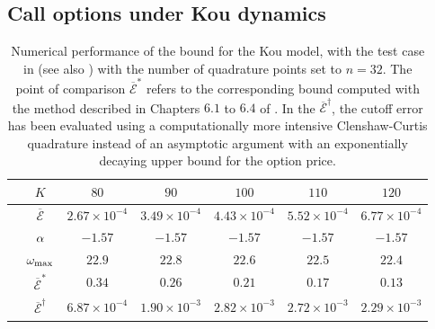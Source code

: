 \documentclass[11pt]{amsart}
\begin{document}
\subsection{Call options under Kou dynamics}

\begin{table}
\begin{center}\begin{tabular}{ccccccc}
\hline
 & $K$ & $80$ & $90$ & $100$ & $110$ & $120$\\
\hline
 & $\overline{\mathcal E}$ & $ 2.67 \times 10^{-4} $ & $  3.49 \times 10^{-4} $ & $  4.43 \times 10^{-4} $ & $ 5.52 \times 10^{-4} $ & $ 6.77 \times 10^{-4} $ \\ 
  & $\alpha$ & $ -1.57 $ & $  -1.57 $ & $  -1.57$ & $ -1.57 $ & $ -1.57$ \\ 
  & $\omega_{\mathrm{\max}}$ & $ 22.9 $ & $  22.8 $ & $  22.6$ & $ 22.5 $ & $22.4$ \\ 
\hline
  &$\overline{\mathcal E}^*$   & $ 0.34 $ & $  0.26 $ & $  0.21$ & $ 0.17 $ & $0.13$ \\ 
 & $\overline{\mathcal E}^{\dagger}$  & $ 6.87 \times 10^{-4} $ & $  1.90 \times 10^{-3} $ & $  2.82 \times 10^{-3} $ & $ 2.72 \times 10^{-3} $ & $ 2.29 \times 10^{-3} $ \\ 
 \hline
\end{tabular}
\end{center}
\caption{\label{tb:usvsleekou}
Numerical performance of the bound for the Kou model, with the test case in
\cite{toivanen2007numerical} (see also \cite{d2005robust}) with the number
of quadrature points set to $n=32$.
The point of comparison $\overline{\mathcal E}^*$ refers to the corresponding bound computed
with the method described in Chapters $6.1$ to $6.4$ of \cite{lee2004option}.
In the $\overline{\mathcal E}^{\dagger}$, the cutoff error has been evaluated using a 
computationally more intensive Clenshaw-Curtis quadrature instead of an asymptotic argument
with an exponentially decaying upper bound for the option price.
}
\end{table}
\end{document}
